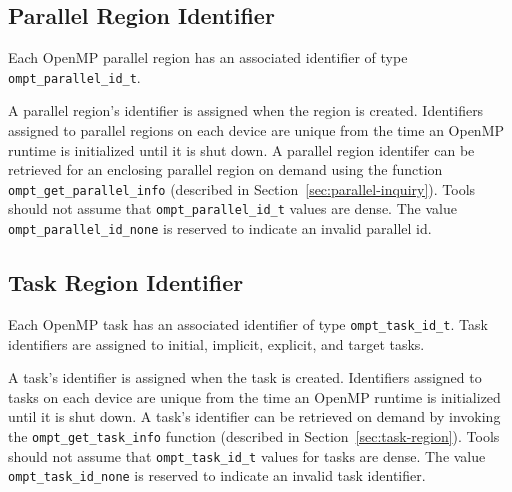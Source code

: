 \documentclass{article}
\begin{document}
\subsection{Parallel Region Identifier}
  Each OpenMP parallel region has an associated identifier of type
  \verb|ompt_parallel_id_t|. 

\noindent
  A parallel region's identifier is assigned
  when the region is created.  Identifiers assigned to parallel regions on each device are unique from the time an 
  OpenMP runtime is initialized until it is shut down. 
  A parallel region identifer can be retrieved for an enclosing parallel region
  on demand using the function \verb|ompt_get_parallel_info|  (described in Section~\ref{sec:parallel-inquiry}).
  Tools should not assume that \verb|ompt_parallel_id_t| values are dense. 
  The value \verb|ompt_parallel_id_none| is reserved to indicate an invalid parallel id.
 
 
  \subsection{Task Region Identifier}
  Each OpenMP task has an associated identifier of type
  \verb|ompt_task_id_t|. Task identifiers are assigned to
   initial, implicit, explicit, and target tasks.

  A task's identifier is assigned
  when the task is created. 
  Identifiers assigned to tasks on each device are unique from the time an 
  OpenMP runtime is initialized until it is shut down. 
  A task's identifier can be retrieved
  on demand by invoking the \verb|ompt_get_task_info|  function (described in Section~\ref{sec:task-region}).
  Tools should not assume that \verb|ompt_task_id_t| values for tasks are dense. 
  The value \verb|ompt_task_id_none| is reserved to indicate an invalid task identifier.
  
\end{document}
